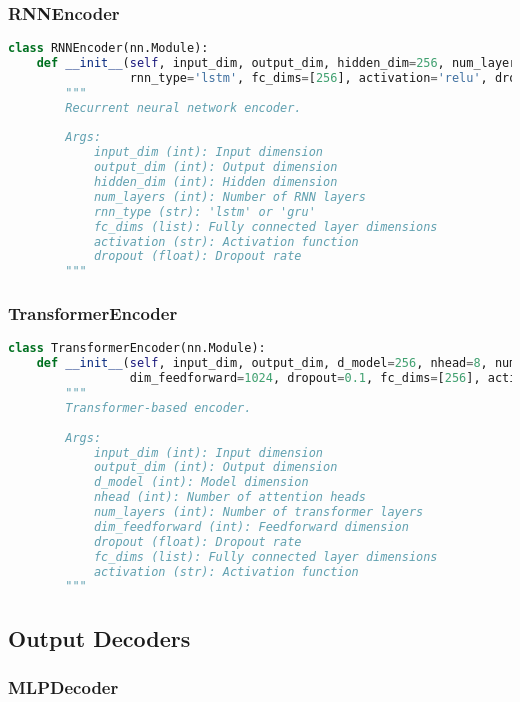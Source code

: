 \subsubsection{RNNEncoder}

\begin{lstlisting}[language=python]
class RNNEncoder(nn.Module):
    def __init__(self, input_dim, output_dim, hidden_dim=256, num_layers=2,
                 rnn_type='lstm', fc_dims=[256], activation='relu', dropout=0.1):
        """
        Recurrent neural network encoder.
        
        Args:
            input_dim (int): Input dimension
            output_dim (int): Output dimension
            hidden_dim (int): Hidden dimension
            num_layers (int): Number of RNN layers
            rnn_type (str): 'lstm' or 'gru'
            fc_dims (list): Fully connected layer dimensions
            activation (str): Activation function
            dropout (float): Dropout rate
        """
\end{lstlisting}

\subsubsection{TransformerEncoder}

\begin{lstlisting}[language=python]
class TransformerEncoder(nn.Module):
    def __init__(self, input_dim, output_dim, d_model=256, nhead=8, num_layers=6,
                 dim_feedforward=1024, dropout=0.1, fc_dims=[256], activation='relu'):
        """
        Transformer-based encoder.
        
        Args:
            input_dim (int): Input dimension
            output_dim (int): Output dimension
            d_model (int): Model dimension
            nhead (int): Number of attention heads
            num_layers (int): Number of transformer layers
            dim_feedforward (int): Feedforward dimension
            dropout (float): Dropout rate
            fc_dims (list): Fully connected layer dimensions
            activation (str): Activation function
        """
\end{lstlisting}

\subsection{Output Decoders}

\subsubsection{MLPDecoder}

